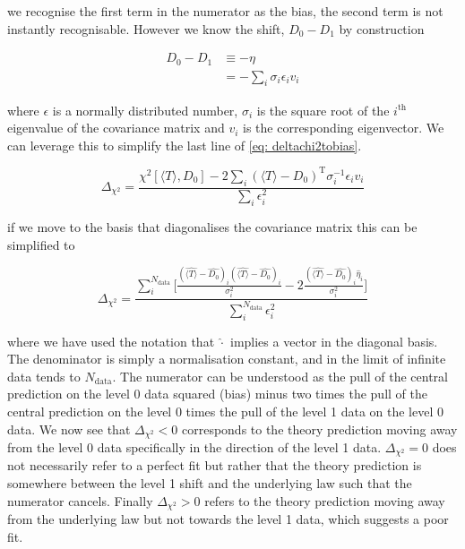 \documentclass[a4paper]{article}
\newcommand{\dcs}{ \Delta_{\chi^{2}} }
\newcommand{\chis}{ \chi^{2} }
\newcommand{\thc}{\langle T \rangle}
\newcommand{\T}[1]{{#1}^{\mathrm{T}}}
\begin{document}
we recognise the first term in the numerator as the bias, the second term is not
instantly recognisable. However we know the shift, $D_{0} - D_{1}$ by construction

\begin{equation}
    \begin{split}
        D_{0} - D_{1} &\equiv - \eta \\
        &= - \sum_{i} \sigma_{i} \epsilon_{i} v_{i}
    \end{split}
\end{equation}

where $\epsilon$ is a normally distributed number, $\sigma_{i}$ is the square root
of the $i^{\mathrm{th}}$ eigenvalue of the covariance matrix and $v_{i}$ is the
corresponding eigenvector. We can leverage this to simplify the last line of
\eqref{eq: deltachi2tobias}.

\begin{equation}
    \dcs = \frac{ \chis[\thc, D_{0}] - 2 \sum_{i} \T{(\thc - D_{0})} \sigma_{i}^{-1} \epsilon_{i} v_{i} }{ \sum_{i} \epsilon_{i}^{2} }
\end{equation}

if we move to the basis that diagonalises the covariance matrix this can be simplified to

\begin{equation}
    \dcs = \frac{ \sum_{i}^{N_{\mathrm{data}}} \big[ 
        \frac{(\hat{\thc} - \hat{D_{0}})_{i} (\hat{\thc} - \hat{D_{0}})_{i}}{\sigma_{i}^{2}} -
        2 \frac{(\hat{\thc} - \hat{D_{0}})_{i} \hat{\eta}_{i}}{\sigma_{i}^{2}} \big] }{
            \sum_{i}^{N_{\mathrm{data}}} \epsilon_{i}^{2} }
\end{equation}

where we have used the notation that $\hat{\cdot}$ implies a vector in the
diagonal basis. The denominator is simply a normalisation constant, and in the
limit of infinite data tends to $N_{\mathrm{data}}$. The numerator can be understood
as the pull of the central prediction on the level 0 data squared (bias)
minus two times the pull of the central prediction on the level 0 times the pull
of the level 1 data on the level 0 data. We now see that $\dcs < 0$ corresponds
to the theory prediction moving away from the level 0 data specifically in the
direction of the level 1 data. $\dcs = 0$ does not necessarily refer to a perfect
fit but rather that the theory prediction is somewhere between the level 1 shift
and the underlying law such that the numerator cancels. Finally $\dcs > 0$ refers
to the theory prediction moving away from the underlying law but not towards the
level 1 data, which suggests a poor fit. 
\end{document}
